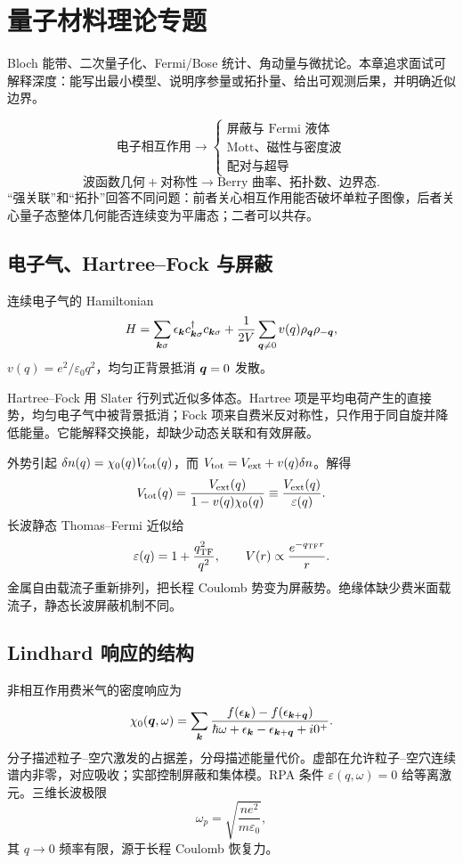 \chapter{量子材料理论专题}

\begin{prereqbox}
Bloch 能带、二次量子化、Fermi/Bose 统计、角动量与微扰论。本章追求面试可解释深度：能写出最小模型、说明序参量或拓扑量、给出可观测后果，并明确近似边界。
\end{prereqbox}
\begin{mapbox}
\[
\text{电子相互作用}\to
\begin{cases}
\text{屏蔽与 Fermi 液体}\\
\text{Mott、磁性与密度波}\\
\text{配对与超导}
\end{cases}
\]
\[
\text{波函数几何}+\text{对称性}
\to\text{Berry 曲率、拓扑数、边界态}.
\]
“强关联”和“拓扑”回答不同问题：前者关心相互作用能否破坏单粒子图像，后者关心量子态整体几何能否连续变为平庸态；二者可以共存。
\end{mapbox}

\section{电子气、Hartree--Fock 与屏蔽}
连续电子气的 Hamiltonian
\[
H=\sum_{\bm{k}\sigma}\epsilon_{\bm{k}}
c_{\bm{k}\sigma}^\dagger c_{\bm{k}\sigma}
+\frac1{2V}\sum_{\bm{q}\ne0}v(q)\rho_{\bm{q}}\rho_{-\bm{q}},
\]
$v(q)=e^2/\varepsilon_0q^2$，均匀正背景抵消 $\bm{q}=0$ 发散。

Hartree--Fock 用 Slater 行列式近似多体态。Hartree 项是平均电荷产生的直接势，均匀电子气中被背景抵消；Fock 项来自费米反对称性，只作用于同自旋并降低能量。它能解释交换能，却缺少动态关联和有效屏蔽。

外势引起
$\delta n(q)=\chi_0(q)V_{\rm tot}(q)$，而
$V_{\rm tot}=V_{\rm ext}+v(q)\delta n$。解得
\[
V_{\rm tot}(q)=\frac{V_{\rm ext}(q)}
{1-v(q)\chi_0(q)}
\equiv\frac{V_{\rm ext}(q)}{\varepsilon(q)}.
\]
长波静态 Thomas--Fermi 近似给
\[
\varepsilon(q)=1+\frac{q_{\rm TF}^2}{q^2},\qquad
V(r)\propto\frac{e^{-q_{\rm TF}r}}r.
\]
金属自由载流子重新排列，把长程 Coulomb 势变为屏蔽势。绝缘体缺少费米面载流子，静态长波屏蔽机制不同。

\section{Lindhard 响应的结构}
非相互作用费米气的密度响应为
\[
\chi_0(\bm{q},\omega)=
\sum_{\bm{k}}\frac{f(\epsilon_{\bm{k}})-
f(\epsilon_{\bm{k}+\bm{q}})}
{\hbar\omega+\epsilon_{\bm{k}}-\epsilon_{\bm{k}+\bm{q}}+i0^+}.
\]
分子描述粒子--空穴激发的占据差，分母描述能量代价。虚部在允许粒子--空穴连续谱内非零，对应吸收；实部控制屏蔽和集体模。RPA 条件
$\varepsilon(q,\omega)=0$ 给等离激元。三维长波极限
\[
\omega_p=\sqrt{\frac{ne^2}{m\varepsilon_0}},
\]
其 $q\to0$ 频率有限，源于长程 Coulomb 恢复力。

